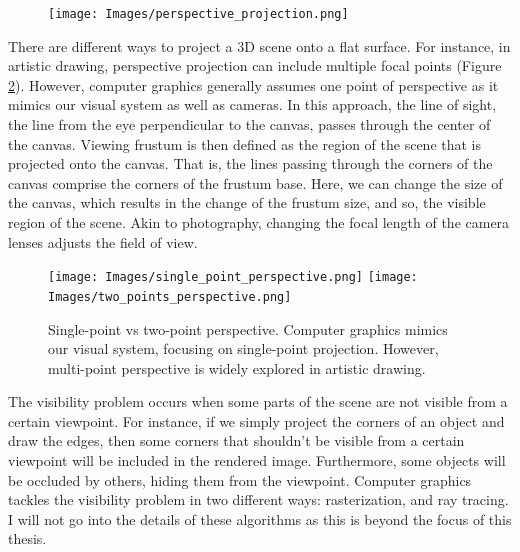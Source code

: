 \begin{figure}[h]
  \centering
   \texttt{[image: Images/perspective\_projection.png]}
   \caption{}
   \label{fig:perspective_projection}
\end{figure}



There are different ways to project a 3D scene onto a flat surface. For instance, in artistic drawing, perspective projection can include multiple focal points (Figure \ref{fig:artistic_drawing}). However, computer graphics generally assumes one point of perspective as it mimics our visual system as well as cameras.  In this approach, the line of sight, the line from the eye perpendicular to the canvas, passes through the center of the canvas. Viewing frustum is then defined as the region of the scene that is projected onto the canvas. That is, the lines passing through the corners of the canvas comprise the corners of the frustum base. Here, we can change the size of the canvas, which results in the change of the frustum size, and so, the visible region of the scene. Akin to photography, changing the focal length of the camera lenses adjusts the field of view.

\begin{figure}[h]
  \centering
   \texttt{[image: Images/single\_point\_perspective.png]}
    \texttt{[image: Images/two\_points\_perspective.png]}

   \caption{Single-point vs two-point perspective. Computer graphics mimics our visual system, focusing on single-point projection. However, multi-point perspective is widely explored in artistic drawing.}
   \label{fig:artistic_drawing}
\end{figure}


The visibility problem occurs when some parts of the scene are not visible from a certain viewpoint. For instance, if we simply project the corners of an object and draw the edges, then some corners that shouldn't be visible from  a certain viewpoint will be included in the rendered image. Furthermore, some objects will be occluded by others, hiding them from the viewpoint. Computer graphics tackles the visibility problem in two different ways: rasterization, and ray tracing. I will not go into the details of these algorithms as this is beyond the focus of this thesis.

